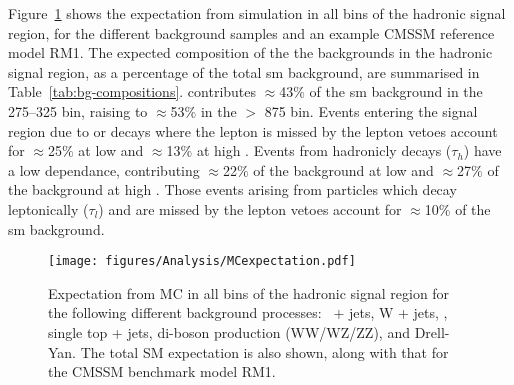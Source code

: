 Figure~\ref{fig:figures_Analysis_MCexpectation}\cite{CMS-AN-11-517} shows the 
expectation from simulation in all bins of the hadronic signal region, for the 
different background samples and an example CMSSM reference model RM1. 
The expected composition of the the backgrounds in the hadronic signal region, 
as a percentage of the total \ac{sm} background, are summarised in 
Table~\ref{tab:bg-compositions}. \HepProcess{\PZ\to\nu\nu} contributes 
$\approx$43$\%$ of the \ac{sm} background in the 
\unit{275}{\GeV}--\unit{325}{\GeV} \HT bin, raising to $\approx$53$\%$ in the 
\HT $>$ \unit{875}{\GeV} bin. Events entering the signal region due to \PZ or 
\PW decays where the lepton is missed by the lepton vetoes account for 
$\approx$25$\%$ at low \HT and $\approx$13$\%$ at high \HT. Events from 
hadronicly decays \Ptau ($\tau_{h}$) have a low \HT dependance, contributing 
$\approx$22$\%$ of the background at low \HT and $\approx$27$\%$ of the 
background at high \HT. Those events arising from \Ptau particles which decay leptonically ($\tau_{l}$) and are missed by the lepton vetoes account for $\approx$10$\%$ of the \ac{sm} background.

\begin{figure}[ht|]
  \centering
    \texttt{[image: figures/Analysis/MCexpectation.pdf]}
  \caption{Expectation from MC in all bins of the hadronic signal
      region for the following different background processes: \HepProcess{\PZ\to\nu\nu}\
      + jets, W + jets, \HepProcess{\Ptop\APtop}, single top + jets, di-boson production
      (WW/WZ/ZZ), and Drell-Yan. The total SM expectation is also
      shown, along with that for the CMSSM benchmark model RM1.}
  \label{fig:figures_Analysis_MCexpectation}
\end{figure}

